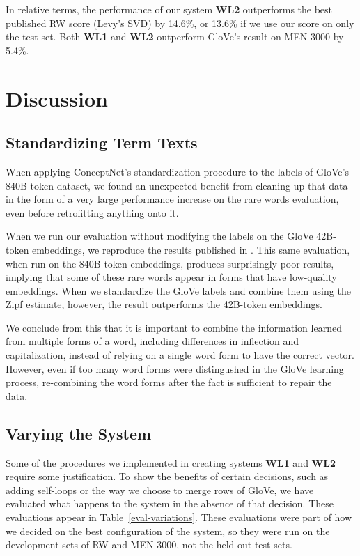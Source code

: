 \documentclass[letterpaper]{article}
\begin{document}
In relative terms, the performance of our system {\bf WL2} outperforms the best
published RW score (Levy's SVD) by 14.6\%, or 13.6\% if we use our score on only
the test set. Both {\bf WL1} and {\bf WL2} outperform GloVe's result on
MEN-3000 by 5.4\%.

\section{Discussion}

\subsection{Standardizing Term Texts}

When applying ConceptNet's standardization procedure to the labels of GloVe's
840B-token dataset, we found an unexpected benefit from cleaning up that data in
the form of a very large performance increase on the rare words evaluation,
even before retrofitting anything onto it.

When we run our evaluation without modifying the labels on the GloVe 42B-token
embeddings, we reproduce the results published in \cite{pennington2014glove}.
This same evaluation, when run on the 840B-token embeddings, produces
surprisingly poor results, implying that some of these rare words appear in
forms that have low-quality embeddings. When we standardize the GloVe labels and
combine them using the Zipf estimate, however, the result outperforms the
42B-token embeddings.

We conclude from this that it is important to combine the information learned
from multiple forms of a word, including differences in inflection and
capitalization, instead of relying on a single word form to have the correct
vector. However, even if too many word forms were distingushed in the GloVe
learning process, re-combining the word forms after the fact is sufficient to
repair the data.

\subsection{Varying the System}

Some of the procedures we implemented in creating systems {\bf WL1} and
{\bf WL2} require some justification. To show the benefits of certain decisions,
such as adding self-loops or the way we choose to merge rows of GloVe, we have
evaluated what happens to the system in the absence of that decision. These
evaluations appear in Table~\ref{eval-variations}. These evaluations were
part of how we decided on the best configuration of the system, so they were
run on the development sets of RW and MEN-3000, not the held-out test sets.
\end{document}
